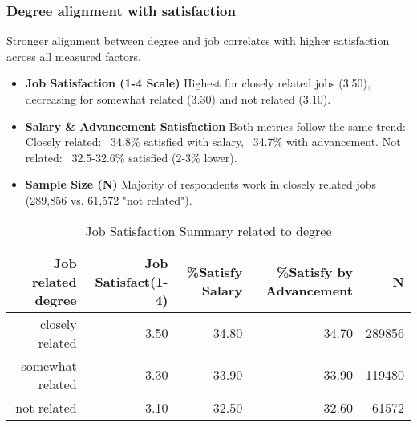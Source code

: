 \documentclass[12pt]{article}
\begin{document}
\subsubsection{Degree alignment with satisfaction}
Stronger alignment between degree and job correlates with higher satisfaction across all measured factors.
\begin{itemize}
    \item \textbf{Job Satisfaction (1-4 Scale)}
    Highest for closely related jobs (3.50), decreasing for somewhat related (3.30) and not related (3.10).
    \item \textbf{Salary \& Advancement Satisfaction} 
    Both metrics follow the same trend:
        Closely related: ~34.8\% satisfied with salary, ~34.7\% with advancement.
        Not related: ~32.5-32.6\% satisfied (2-3\% lower).
    \item \textbf{Sample Size (N)}
    Majority of respondents work in closely related jobs (289,856 vs. 61,572 "not related").
\end{itemize}


\begin{table}[ht]
\centering
\begin{tabular}{|r|r|r|r|r|}
  \hline
Job related degree & Job Satisfact(1-4) & \%Satisfy Salary & \%Satisfy by Advancement & N \\ 
  \hline
closely related & 3.50 & 34.80 & 34.70 & 289856\\ \hline
  somewhat related & 3.30 & 33.90 & 33.90 & 119480 \\ \hline
  not related & 3.10 & 32.50 & 32.60 & 61572 \\ 
   \hline
\end{tabular}
\caption{Job Satisfaction Summary related to degree} 
\label{tab:satisfaction}
\end{table}
\end{document}
